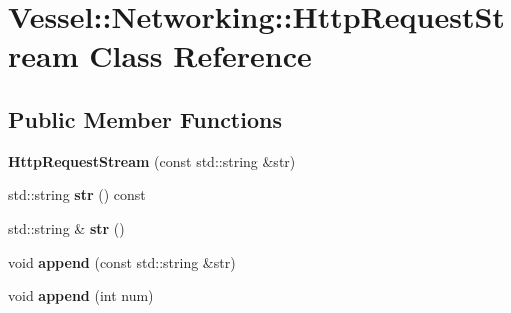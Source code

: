 \hypertarget{class_vessel_1_1_networking_1_1_http_request_stream}{}\section{Vessel\+:\+:Networking\+:\+:Http\+Request\+Stream Class Reference}
\label{class_vessel_1_1_networking_1_1_http_request_stream}
\subsection*{Public Member Functions}
\begin{DoxyCompactItemize}
\item 
\mbox{\label{class_vessel_1_1_networking_1_1_http_request_stream_a14a71737997cc7f73bbd3e33b43a659d}} 
{\bfseries Http\+Request\+Stream} (const std\+::string \&str)
\item 
\mbox{\label{class_vessel_1_1_networking_1_1_http_request_stream_aaaf4033cf1223f0928706b8fbf00e85b}} 
std\+::string {\bfseries str} () const
\item 
\mbox{\label{class_vessel_1_1_networking_1_1_http_request_stream_af600015104b9426c5f2b276de0cc5ac9}} 
std\+::string \& {\bfseries str} ()
\item 
\mbox{\label{class_vessel_1_1_networking_1_1_http_request_stream_ac738ef27538c0f9e3b881cbf1f3edefc}} 
void {\bfseries append} (const std\+::string \&str)
\item 
\mbox{\label{class_vessel_1_1_networking_1_1_http_request_stream_a01c538560d550ed4a2c7cd50e579b840}} 
void {\bfseries append} (int num)
\end{DoxyCompactItemize}
